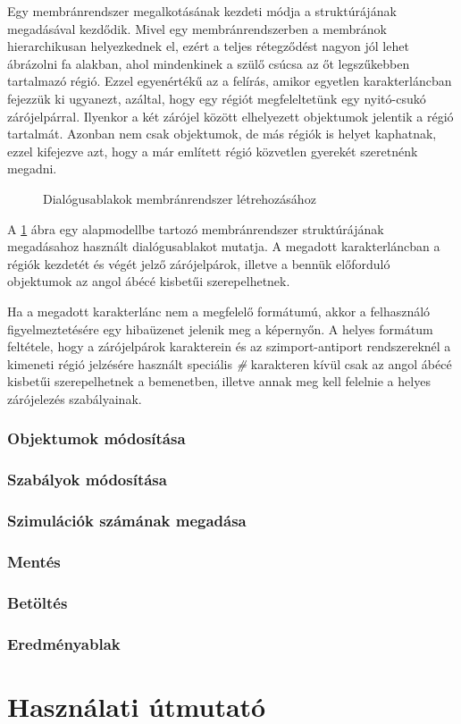 Egy membránrendszer megalkotásának kezdeti módja a struktúrájának megadásával kezdődik. Mivel egy membránrendszerben a membránok hierarchikusan helyezkednek el, ezért a teljes rétegződést nagyon jól lehet ábrázolni fa alakban, ahol mindenkinek a szülő csúcsa az őt legszűkebben tartalmazó régió. Ezzel egyenértékű az a felírás, amikor egyetlen karakterláncban fejezzük ki ugyanezt, azáltal, hogy egy régiót megfeleltetünk egy nyitó-csukó zárójelpárral. Ilyenkor a két zárójel között elhelyezett objektumok jelentik a régió tartalmát. Azonban nem csak objektumok, de más régiók is helyet kaphatnak, ezzel kifejezve azt, hogy a már említett régió közvetlen gyerekét szeretnénk megadni. 

\begin{figure}[H]
	\centering
	\vspace{5pt}
	\caption{Dialógusablakok membránrendszer létrehozásához}
	\label{fig:example-2}
\end{figure}

A \ref{fig:example-2} ábra egy alapmodellbe tartozó membránrendszer struktúrájának megadásahoz használt dialógusablakot mutatja. A megadott karakterláncban a régiók kezdetét és végét jelző zárójelpárok, illetve a bennük előforduló objektumok az angol ábécé kisbetűi szerepelhetnek.

Ha a megadott karakterlánc nem a megfelelő formátumú, akkor a felhasználó figyelmeztetésére egy hibaüzenet jelenik meg a képernyőn. A helyes formátum feltétele, hogy a zárójelpárok karakterein és az szimport-antiport rendszereknél a kimeneti régió jelzésére használt speciális \textit{\#} karakteren kívül csak az angol ábécé kisbetűi szerepelhetnek a bemenetben, illetve annak meg kell felelnie a helyes zárójelezés szabályainak. 



\subsubsection{Objektumok módosítása}
\subsubsection{Szabályok módosítása}
\subsubsection{Szimulációk számának megadása}
\subsubsection{Mentés}
\subsubsection{Betöltés}
\subsubsection{Eredményablak}

\section{Használati útmutató}\label{help}